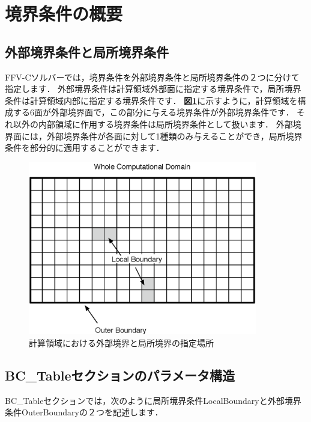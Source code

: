 \graphicspath{{./fig_BC/}}

%
\section{境界条件の概要}

%
\hypertarget{tgt:BC policy}{\subsection{外部境界条件と局所境界条件}}
FFV-Cソルバーでは，境界条件を外部境界条件と局所境界条件の２つに分けて指定します．
外部境界条件は計算領域外部面に指定する境界条件で，局所境界条件は計算領域内部に指定する境界条件です．
\textbf{図\ref{fig:BCs}}に示すように，計算領域を構成する6面が外部境界面で，この部分に与える境界条件が外部境界条件です．
それ以外の内部領域に作用する境界条件は局所境界条件として扱います．
外部境界面には，外部境界条件が各面に対して1種類のみ与えることができ，局所境界条件を部分的に適用することができます．

\begin{figure}[htbp]
\begin{center}
\includegraphics[width=10cm,clip]{Boundary.eps}
\end{center}
\caption{計算領域における外部境界と局所境界の指定場所}
\label{fig:BCs}
\end{figure}


%
\subsection{BC\_Tableセクションのパラメータ構造}

BC\_Tableセクションでは，次のように局所境界条件LocalBoundaryと外部境界条件OuterBoundaryの２つを記述します．

